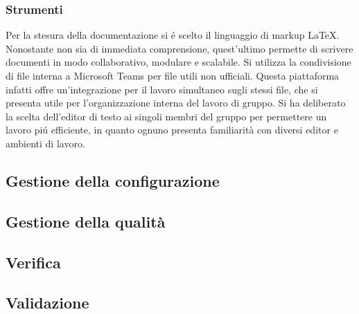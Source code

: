   \subsubsection{Strumenti}
    \subsubsubsection{\LaTeX}
    Per la stesura della documentazione si é scelto il linguaggio di markup \LaTeX. Nonostante non sia di immediata comprensione, quest'ultimo permette di scrivere documenti in modo collaborativo, modulare e scalabile.
    Si utilizza la condivisione di file interna a Microsoft Teams per file utili non ufficiali. Questa piattaforma infatti offre un'integrazione per il lavoro simultaneo sugli stessi file, che si presenta utile per l'organizzazione interna del lavoro di gruppo.
    Si ha deliberato la scelta dell'editor di testo ai singoli membri del gruppo per permettere un lavoro piú efficiente, in quanto ognuno presenta familiarità con diversi editor e ambienti di lavoro.



  \subsection{Gestione della configurazione}
  \subsection{Gestione della qualità}
  \subsection{Verifica}
  \subsection{Validazione}
